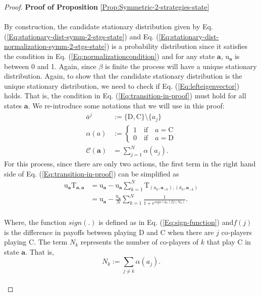 \documentclass[11pt]{article}
\theoremstyle{plainCl1}
\theoremstyle{plainCl2}
\newcommand{\abf}{\mathbf{a}}
\newcommand{\C}{\mathrm{C}}
\newcommand{\D}{\mathrm{D}}
\begin{document}
\begin{proof}
\textbf{Proof of Proposition} \ref{Prop:Symmetric-2-strategies-state} \\ \\
By construction, the candidate stationary distribution given by Eq. (\ref{Eq:stationary-dist-symm-2-stgs-state}) and Eq. (\ref{Eq:stationary-dist-normalization-symm-2-stgs-state}) is a probability distribution since it satisfies the condition in Eq. (\ref{Eq:normalizationcondition}) and for any state $\abf$, $\mathrm{u}_{\abf}$ is between 0 and 1.  Again, since $\beta$ is finite the process will have a unique stationary distribution. Again, to show that the candidate stationary distribution is the unique stationary distribution, we need to check if Eq. (\ref{Eq:lefteigenvector}) holds. That is, the condition in Eq. (\ref{Eq:transition-in-proof}) must hold for all states $\abf$. We re-introduce some notations that we will use in this proof: 
\begin{align}
\bar{a}^j &:= \{\D,\C\} \setminus \{a_j\} \\[10pt]
\alpha(a)&:= 
\begin{cases}
1 \quad \text{if} \quad a = \C \\[10pt]
0 \quad \text{if} \quad a = \D 
\end{cases}\\[10pt]
\mathcal{C}(\abf) &= \sum_{j=1}^N \alpha(a_j) .
\end{align}
For this process, since there are only two actions, the first term in the right hand side of Eq. (\ref{Eq:transition-in-proof}) can be simplified as 
\begin{align}
\mathrm{u}_{\abf} \mathrm{T}_{\abf,\abf}  &= \mathrm{u}_\abf - \mathrm{u}_{\abf} \sum_{k=1}^{N} \mathrm{T}_{(a_k, \abf_{-k}),(\bar{a}_{k}, \abf_{-k})} \\[10pt]
&= \mathrm{u}_{\abf} - \frac{\mathrm{u}_{\abf}}{N} \sum_{k=1}^N \frac{1}{1 + \displaystyle e^{\mathit{sign}(\bar{a}_{k}) \beta f(N_k)}} .
\label{Eq:T_aa_u_a term}
\end{align}
\\ \noindent Where, the function $\mathit{sign}(.)$ is  defined as in Eq. (\ref{Eq:sign-function}) and$f(j)$ is the difference in payoffs between playing $\D$ and $\C$ when there are $j$ co-players playing $\C$. The term $N_k$ represents the number of co-players of $k$ that play $\C$ in state $\abf$. That is,
\begin{equation}
N_k := \sum_{j \neq k} \alpha(a_j) .
\end{equation} \\

\end{proof}
\end{document}
